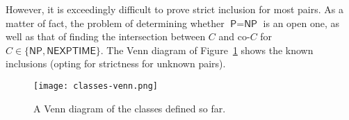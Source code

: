However, it is exceedingly difficult to prove strict inclusion for most pairs. As a matter of fact, the problem of determining whether \(\textsf{P} = \textsf{NP}\) is an open one, as well as that of finding the intersection between \(C\) and co-\(C\) for \(C\in\{\textsf{NP}, \textsf{NEXPTIME}\}\). The Venn diagram of Figure~\ref{fig:classes-venn} shows the known inclusions (opting for strictness for unknown pairs).


\begin{figure}[htb]
    \begin{center}
       \texttt{[image: classes-venn.png]}
    \end{center}
    \caption{A Venn diagram of the classes defined so far.}
    \label{fig:classes-venn}
\end{figure}

